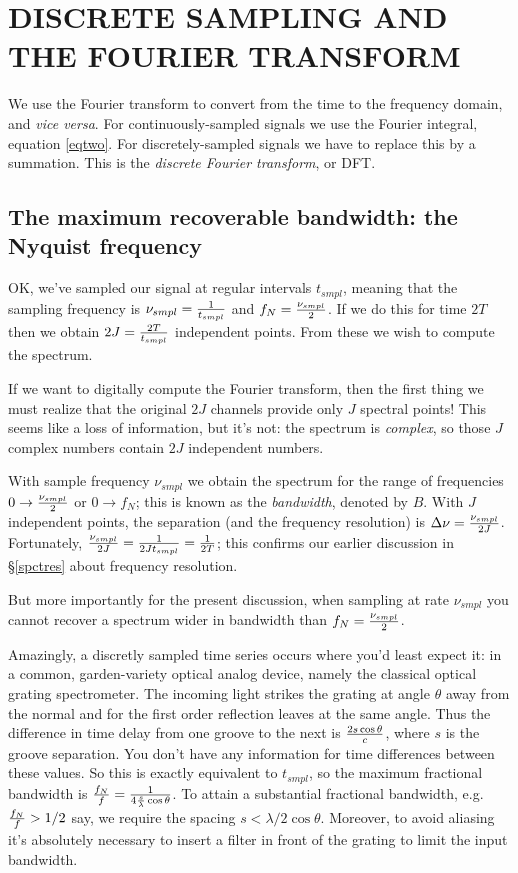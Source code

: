 \documentclass[preprint]{aastex}
\begin{document}
\section{DISCRETE SAMPLING AND THE FOURIER TRANSFORM}

          We use the Fourier transform to convert from the time to the
frequency domain, and {\it vice versa}.  For continuously-sampled
signals we use the Fourier integral, equation \ref{eqtwo}. For
discretely-sampled signals we have to replace this by a summation.  This
is the {\it discrete Fourier transform}, or DFT. 

\subsection {The maximum recoverable bandwidth: the Nyquist frequency}

         OK, we've sampled our signal at regular intervals $t_{smpl}$,
meaning that the sampling frequency is $\nu_{smpl} = {1 \over t_{smpl}}$
and $f_N = {\nu_{smpl} \over 2}$. If we do this for time $2T$ then we
obtain $2J = {2T \over t_{smpl}}$ independent points. From these we wish
to compute the spectrum.

	If we want to digitally compute the Fourier transform, then the
first thing we  must realize that the original $2J$ channels provide
only $J$ spectral points! This seems like a loss of information, but
it's not: the spectrum is {\it complex}, so those $J$ complex numbers
contain $2J$ independent numbers. 

	With sample frequency $\nu_{smpl}$ we obtain the spectrum for
the range of frequencies $0 \rightarrow {\nu_{smpl} \over 2}$ or $0
\rightarrow f_N$; this is known as the {\it bandwidth}, denoted by $B$.
With $J$ independent points, the separation (and the frequency
resolution) is $\Delta \nu = {\nu_{smpl} \over 2J}$. Fortunately,
${\nu_{smpl} \over 2J} = {1 \over 2 J t_{smpl}} = {1 \over 2T}$; this
confirms our earlier discussion in \S \ref{spctres} about frequency
resolution. 

	But more importantly for the present discussion, when sampling
at rate $\nu_{smpl}$ you cannot recover a spectrum wider in bandwidth
than $f_N = {\nu_{smpl} \over 2}$. 

	Amazingly, a discretly sampled time series occurs where you'd
least expect it: in a common, garden-variety optical analog device,
namely the classical optical grating spectrometer. The incoming light
strikes the grating at angle $\theta$ away from the normal and for the
first order reflection leaves at the same angle. Thus the difference in
time delay from one groove to the next is ${2s \cos \theta \over c}$,
where $s$ is the groove separation. You don't have any information for
time differences between these values. So this is exactly equivalent to
$t_{smpl}$, so the maximum fractional bandwidth is ${f_N \over f} = {1
\over 4 {s \over \lambda} \cos \theta}$. To attain a substantial
fractional bandwidth, e.g.\ ${f_N \over f} > {1/2}$ say, we require the
spacing $s < {\lambda /2 \cos \theta}$. Moreover, to avoid aliasing it's
absolutely necessary to insert a filter in front of the grating to limit
the input bandwidth. 
\end{document}
